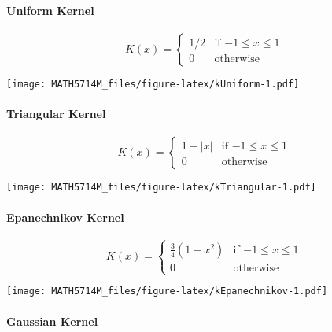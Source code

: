\documentclass[
  a4paper,
]{article}
\theoremstyle{definition}
\theoremstyle{definition}
\theoremstyle{definition}
\theoremstyle{definition}
\theoremstyle{remark}
\begin{document}
\hypertarget{uniform-kernel}{%
\paragraph{Uniform Kernel}\label{uniform-kernel}}

\begin{equation*}
  K(x)
  = \begin{cases}
      1/2 & \mbox{if $-1 \leq x \leq 1$} \\
      0 & \mbox{otherwise}
    \end{cases}
\end{equation*}

\texttt{[image: MATH5714M\_files/figure-latex/kUniform-1.pdf]}

\hypertarget{triangular-kernel}{%
\paragraph{Triangular Kernel}\label{triangular-kernel}}

\begin{equation*}
  K(x)
  = \begin{cases}
      1-|x| & \mbox{if $-1 \leq x \leq 1$} \\
      0 & \mbox{otherwise}
    \end{cases}
\end{equation*}

\texttt{[image: MATH5714M\_files/figure-latex/kTriangular-1.pdf]}

\hypertarget{epanechnikov-kernel}{%
\paragraph{Epanechnikov Kernel}\label{epanechnikov-kernel}}

\begin{equation*}
  K(x)
  = \begin{cases}
      \frac34 (1-x^2) & \mbox{if $-1 \leq x \leq 1$} \\
      0 & \mbox{otherwise}
    \end{cases}
\end{equation*}

\texttt{[image: MATH5714M\_files/figure-latex/kEpanechnikov-1.pdf]}

\hypertarget{gaussian-kernel}{%
\paragraph{Gaussian Kernel}\label{gaussian-kernel}}
\end{document}
